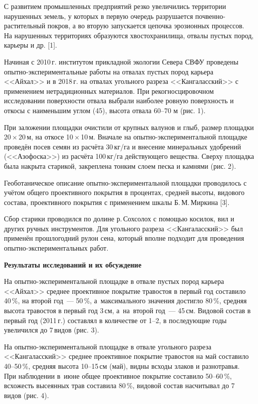 С развитием промышленных предприятий резко увеличились территории нарушенных земель, у которых в первую очередь разрушается почвенно-растительный покров, а во вторую запускается цепочка эрозионных процессов. На нарушенных территориях образуются хвостохранилища, отвалы пустых пород, карьеры и др. [1].

Начиная с 2010\,г. институтом прикладной экологии Севера СВФУ проведены опытно-экспериментальные работы на отвалах пустых пород карьера <<Айхал>> и в 2018\,г. на отвалах угольного разреза <<Кангаласский>> с применением нетрадиционных материалов. При рекогносцировочном исследовании поверхности отвала выбрали наиболее ровную поверхность и откосы с наименьшим углом (45\dg), высота отвала 60--70 м (рис. 1).

При заложении площадки очистили от крупных валунов и глыб, размер площадки 20\,$\times$\,20\,м, на откосе 10\,$\times$\,10\,м. Вначале на опытно-экс\-пе\-ри\-мен\-таль\-ной площадке проведён посев семян из расчёта 30\,кг/га и внесение минеральных удобрений (<<Азофоска>>) из расчёта 100\,кг/га действующего вещества. Сверху площадка была накрыта старикой, закреплена тонким слоем песка и камнями (рис. 2).

Геоботаническое описание опытно-экспериментальной площадки проводилось с учётом общего проективного покрытия в процентах, средней высоты, видового состава, проективного покрытия с применением шкалы Б.\,М.\,Миркина [3].

Сбор старики проводился по долине р.\,Сохсолох с помощью косилок, вил и других ручных инструментов. Для угольного разреза <<Кангаласский>> был применён прошлогодний рулон сена, который вполне подходит для проведения опытно-экспериментальных работ.

\textbf{Результаты исследований и их обсуждение}

На опытно-экспериментальной площадке в отвале пустых пород карьера <<Айхал>> среднее проективное покрытие травостоя в первый год составило 40\,\%, на второй год~--- 50\,\%, а~максимального значения достигло 80\,\%, средняя высота травостоя в первый год 3\,см, а~на~второй год~--- 45\,см. Видовой состав в первый год (2011\,г.) составлял в количестве от 1--2, в последующие годы увеличился до 7\,видов (рис. 3).





На опытно-экспериментальной площадке в отвале угольного разреза <<Кангаласский>> среднее проективное покрытие травостоя на май составило 40--50\,\%, средняя высота 10--15\,см (май), видны всходы злаков и разнотравья. При наблюдении в~июне общее проективное покрытие составило 50--60\,\%, всхожесть высеянных трав составила 80\,\%, видовой состав насчитывал до 7 видов (рис. 4).

